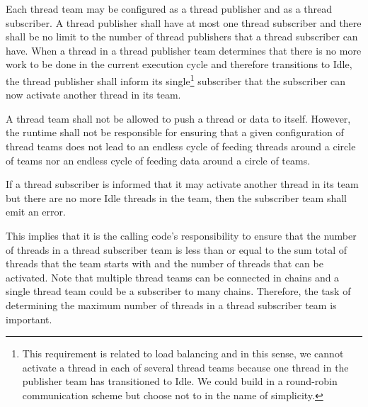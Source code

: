\documentclass{article}
\begin{document}
\begin{req}
\label{req:ThreadSubPub}
Each thread team may be configured as a thread publisher and as a
thread subscriber.  A thread publisher shall have at most one thread
subscriber and there shall be no limit to the number of thread publishers that a
thread subscriber can have.  When a thread in a thread publisher team determines
that there is no more work to be done in the current execution cycle and
therefore transitions to Idle, the thread publisher shall inform its
single\footnote{This requirement is related to load balancing and in this sense,
we cannot activate a thread in each of several thread teams because one thread
in the publisher team has transitioned to Idle.  We could build in a round-robin communication
scheme but choose not to in the name of simplicity.} subscriber that the
subscriber can now activate another thread in its team.
\end{req}

\begin{req}
A thread team shall not be allowed to push a thread or data to itself.  However,
the runtime shall not be responsible for ensuring that a given configuration of
thread teams does not lead to an endless cycle of feeding threads around a
circle of teams nor an endless cycle of feeding data around a circle of teams.
\end{req}

\begin{req}
\label{req:ThreadBalance}
If a thread subscriber is informed that it may activate another thread in its
team but there are no more Idle threads in the team, then the subscriber team
shall emit an error.
\end{req}

This implies that it is the calling code's responsibility to ensure that the
number of threads in a thread subscriber team is less than or equal to the sum
total of threads that the team starts with and the number of threads that can be
activated.  Note that multiple thread teams can be connected in chains and a
single thread team could be a subscriber to many chains.  Therefore, the task of
determining the maximum number of threads in a thread subscriber team is important.
\end{document}

